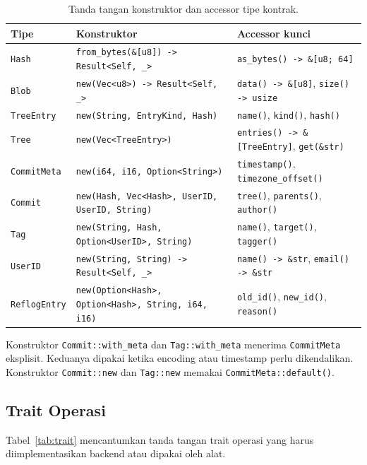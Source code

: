 \documentclass[11pt,a4paper]{article}
\begin{document}
\begin{table}[H]
	\centering
	\caption{Tanda tangan konstruktor dan accessor tipe kontrak.}
	\label{tab:tipe}
	\footnotesize
	\begin{tabularx}{\textwidth}{l X X}
		\toprule
		Tipe & Konstruktor & Accessor kunci \\
		\midrule
		\texttt{Hash} & \texttt{from\_bytes(\&[u8]) -> Result<Self, \_>} & \texttt{as\_bytes() -> \&[u8; 64]} \\
		\texttt{Blob} & \texttt{new(Vec<u8>) -> Result<Self, \_>} & \texttt{data() -> \&[u8]}, \texttt{size() -> usize} \\
		\texttt{TreeEntry} & \texttt{new(String, EntryKind, Hash)} & \texttt{name()}, \texttt{kind()}, \texttt{hash()} \\
		\texttt{Tree} & \texttt{new(Vec<TreeEntry>)} & \texttt{entries() -> \&[TreeEntry]}, \texttt{get(\&str)} \\
		\texttt{CommitMeta} & \texttt{new(i64, i16, Option<String>)} & \texttt{timestamp()}, \texttt{timezone\_offset()} \\
		\texttt{Commit} & \texttt{new(Hash, Vec<Hash>, UserID, UserID, String)} & \texttt{tree()}, \texttt{parents()}, \texttt{author()} \\
		\texttt{Tag} & \texttt{new(String, Hash, Option<UserID>, String)} & \texttt{name()}, \texttt{target()}, \texttt{tagger()} \\
		\texttt{UserID} & \texttt{new(String, String) -> Result<Self, \_>} & \texttt{name() -> \&str}, \texttt{email() -> \&str} \\
		\texttt{ReflogEntry} & \texttt{new(Option<Hash>, Option<Hash>, String, i64, i16)} & \texttt{old\_id()}, \texttt{new\_id()}, \texttt{reason()} \\
		\bottomrule
	\end{tabularx}
\end{table}

Konstruktor \texttt{Commit::with\_meta} dan \texttt{Tag::with\_meta} menerima \texttt{CommitMeta} eksplisit. Keduanya dipakai ketika encoding atau timestamp perlu dikendalikan. Konstruktor \texttt{Commit::new} dan \texttt{Tag::new} memakai \texttt{CommitMeta::default()}.

\subsection{Trait Operasi}

Tabel~\ref{tab:trait} mencantumkan tanda tangan trait operasi yang harus diimplementasikan backend atau dipakai oleh alat.
\end{document}
